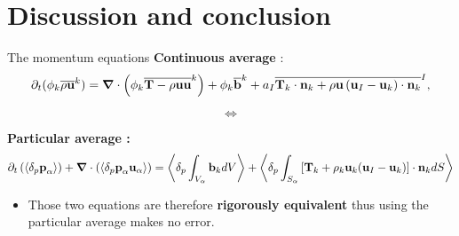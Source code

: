 \documentclass{sintefbeamer}
\newcommand{\nablab}{\bm{\nabla}}
\begin{document}
\section{Discussion and conclusion}
\begin{frame}
  {The momentum equations}
  \textbf{Continuous average} :
  \begin{equation*}
      \pddt (\phi_k\kavg{\rho \textbf{u}})
      = \nablab \cdot \left(
          \phi_k \kavg{\textbf{T} - \rho \textbf{u} \textbf{u}}
      \right)
      + \phi_k \kavg{\textbf{b}}
      + a_I \Iavg{
          \textbf{T}_k \cdot \textbf{n}_k
          + \rho \textbf{u}
          \left(
              \textbf{u}_I
              - \textbf{u}_k
          \right) \cdot \textbf{n}_k
      },
  \end{equation*}

  \begin{center}
    \begin{equation*}
      \Longleftrightarrow 
    \end{equation*}
  \end{center}
  \textbf{Particular average :}
  \begin{equation*}
    \pddt   \left(\pavg{\textbf{p}_\alpha}\right)
    + \nablab \cdot \left(\pavg{\textbf{p}_\alpha \textbf{u}_\alpha}\right) 
    = \pavg{\int_{V_\alpha} \textbf{b}_k dV}
    + \pavg{\int_{S_\alpha} \left[
      \textbf{T}_k + \rho_k \textbf{u}_k (\textbf{u}_I-\textbf{u}_k) 
      \right] \cdot \textbf{n}_k d S}
\end{equation*}
\begin{itemize}
  \item Those two equations are therefore \textbf{rigorously equivalent} thus using the particular average makes no error. 
\end{itemize}
\end{frame}
\end{document}
